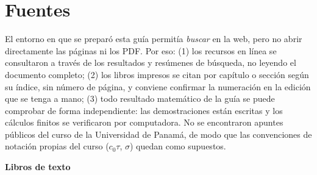 \section*{Fuentes}
\begin{ojo}
El entorno en que se preparó esta guía permitía \emph{buscar} en la web, pero no abrir directamente las páginas ni los
PDF. Por eso: (1) los recursos en línea se consultaron a través de los resultados y resúmenes de búsqueda, no leyendo
el documento completo; (2) los libros impresos se citan por capítulo o sección según su índice, sin número de página,
y conviene confirmar la numeración en la edición que se tenga a mano; (3) todo resultado matemático de la guía se
puede comprobar de forma independiente: las demostraciones están escritas y los cálculos finitos se verificaron por
computadora. No se encontraron apuntes públicos del curso de la Universidad de Panamá, de modo que las convenciones de
notación propias del curso ($c_0\tau$, $\sigma$) quedan como supuestos.
\end{ojo}
\textbf{Libros de texto}

